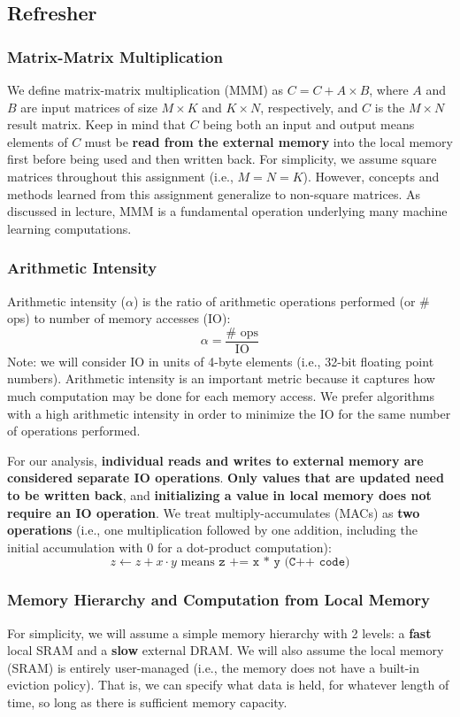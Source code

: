 \documentclass[a4 paper]{article}
\begin{document}
\subsection*{Refresher}
\subsubsection*{Matrix-Matrix Multiplication}
We define matrix-matrix multiplication (MMM) as $C = C + A \times B$, where $A$ and $B$ are input matrices of size $M \times K$ and $K \times N$, respectively, and $C$ is the $M \times N$ result matrix.
Keep in mind that $C$ being both an input and output means elements of $C$ must be \textbf{read from the external memory} into the local memory first before being used and then written back.
For simplicity, we assume square matrices throughout this assignment (i.e., $M = N = K$). 
However, concepts and methods learned from this assignment generalize to non-square matrices.
As discussed in lecture, MMM is a fundamental operation underlying many machine learning computations. 

\subsubsection*{Arithmetic Intensity}
Arithmetic intensity ($\alpha$) is the ratio of arithmetic operations performed (or \# ops) to number of memory accesses (IO):
\[
\alpha = \frac{\#\text{ ops}}{\text{IO}}
\]
Note: we will consider IO in units of 4-byte elements (i.e., 32-bit floating point numbers).
Arithmetic intensity is an important metric because it captures how much computation may be done for each memory access.
We prefer algorithms with a high arithmetic intensity in order to minimize the IO for the same number of operations performed.

For our analysis, \textbf{individual reads and writes to external memory are considered separate IO operations}.
\textbf{Only values that are updated need to be written back}, and \textbf{initializing a value in local memory does not require an IO operation}. 
We treat multiply-accumulates (MACs) as \textbf{two operations} (i.e., one multiplication followed by one addition, including the initial accumulation with 0 for a dot-product computation):
\[
 z \leftarrow z + x \cdot y \text{ means } \texttt{z += x * y (C++ code)}
\]

\subsubsection*{Memory Hierarchy and Computation from Local Memory}
For simplicity, we will assume a simple memory hierarchy with 2 levels: a \textbf{fast} local SRAM and a \textbf{slow} external DRAM.
We will also assume the local memory (SRAM) is entirely user-managed (i.e., the memory does not have a built-in eviction policy).
That is, we can specify what data is held, for whatever length of time, so long as there is sufficient memory capacity.
\end{document}
